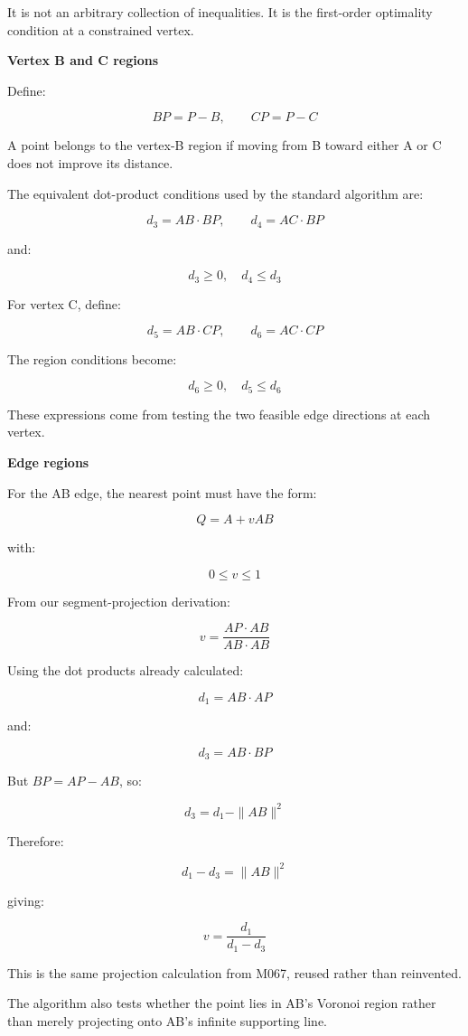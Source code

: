 It is not an arbitrary collection of inequalities. It is the first-order optimality condition at a constrained vertex.

\textbf{Vertex B and C regions}

Define:

\[
BP=P-B,\qquad CP=P-C
\]

A point belongs to the vertex-B region if moving from B toward either A or C does not improve its distance.

The equivalent dot-product conditions used by the standard algorithm are:

\[
d_3=AB\cdot BP,\qquad d_4=AC\cdot BP
\]

and:

\[
\boxed{d_3\ge0,\quad d_4\le d_3}
\]

For vertex C, define:

\[
d_5=AB\cdot CP,\qquad d_6=AC\cdot CP
\]

The region conditions become:

\[
\boxed{d_6\ge0,\quad d_5\le d_6}
\]

These expressions come from testing the two feasible edge directions at each vertex.

\textbf{Edge regions}

For the AB edge, the nearest point must have the form:

\[
Q=A+vAB
\]

with:

\[
0\le v\le1
\]

From our segment-projection derivation:

\[
v=\frac{AP\cdot AB}{AB\cdot AB}
\]

Using the dot products already calculated:

\[
d_1=AB\cdot AP
\]

and:

\[
d_3=AB\cdot BP
\]

But \(BP=AP-AB\), so:

\[
d_3=d_1-\|AB\|^2
\]

Therefore:

\[
d_1-d_3=\|AB\|^2
\]

giving:

\[
\boxed{v=\frac{d_1}{d_1-d_3}}
\]

This is the same projection calculation from M067, reused rather than reinvented.

The algorithm also tests whether the point lies in AB's Voronoi region rather than merely projecting onto AB's infinite supporting line.

